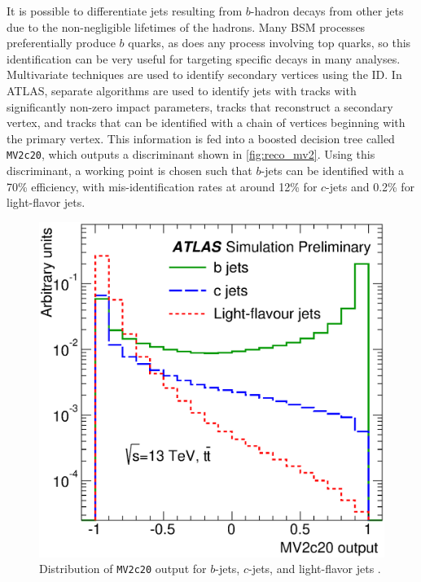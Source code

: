 It is possible to differentiate jets resulting from $b$-hadron decays from other jets due to the non-negligible lifetimes of the hadrons. Many \ac{BSM} processes preferentially produce $b$ quarks, as does any process involving top quarks, so this identification can be very useful for targeting specific decays in many analyses. Multivariate techniques are used to identify secondary vertices using the \ac{ID}\cite{ATL-PHYS-PUB-2015-022}. In ATLAS, separate algorithms are used to identify jets with tracks with significantly non-zero impact parameters, tracks that reconstruct a secondary vertex, and tracks that can be identified with a chain of vertices beginning with the primary vertex. This information is fed into a boosted decision tree called \texttt{MV2c20}, which outputs a discriminant shown in \autoref{fig:reco_mv2}. Using this discriminant, a working point is chosen such that $b$-jets can be identified with a 70\% efficiency, with mis-identification rates at around 12\% for $c$-jets and 0.2\% for light-flavor jets.

\begin{centering}
\begin{figure}[!hbt]
\myfloatalign
\includegraphics[width=.9\linewidth]{figures/reco/fig_08.eps}
\caption{ Distribution of \texttt{MV2c20} output for $b$-jets, $c$-jets, and light-flavor jets \cite{ATL-PHYS-PUB-2015-022}. }
\label{fig:reco_mv2}
\end{figure}
\end{centering}

